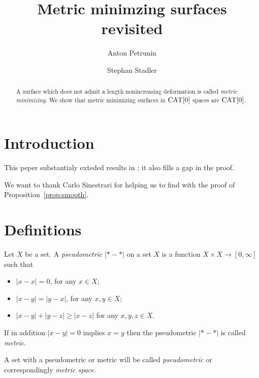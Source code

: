 \documentclass[a4paper,10pt]{amsart}
\begin{document}
\title{Metric minimzing surfaces revisited}
\author{Anton Petrunin}
\address{A. Petrunin\newline\vskip-4mm
Math. Dept. PSU,
University Park, PA 16802,
USA}
\author{Stephan Stadler}
\address{S. Stadler\newline\vskip-4mm
Math. Inst.,
Universit\"at M\"unchen, Theresienstr. 39, D-80333 M\"unchen, Germany}


\date{}

\begin{abstract}
A surface which does not admit a length nonincreasing deformation is called \emph{metric minimizing}.
We show that metric minimizing surfaces in $\mathop{\rm CAT}\nolimits[0]$ spaces are $\mathop{\rm CAT}\nolimits[0]$.
\end{abstract}
\maketitle

\section{Introduction}

This peper substantialy exteded results in \cite{petrunin-metric-min}; it also fills a gap in the proof. 

We want to thank Carlo Sinestrari for helping us to find with the proof of Proposition~\ref{prop:smooth}.

\section{Definitions}

Let $X$ be a set.
A \emph{pseudometric} $|{*}-{*}|$ on a set $X$ 
is a function $X\times X\to[0,\infty]$
such that 
\begin{itemize}
\item $|x-x|=0$, for any $x\in X$;
\item $|x-y|=|y-x|$, for any $x,y\in X$;
\item $|x-y|+|y-z|\ge|x-z|$ for any  $x,y,z\in X$.
\end{itemize}
If in addition $|x-y|=0$ implies $x=y$ then the pseudometric $|{*}-{*}|$ is called \emph{metric}.

A set with a pseudometric or metric will be called \emph{pseudometric} or correspondingly \emph{metric space}.
\end{document}
